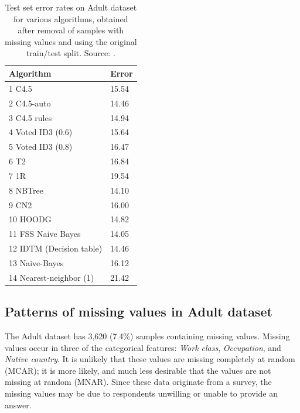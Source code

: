 \documentclass[10pt,twocolumn,letterpaper]{article}
\begin{document}
\begin{table}[htb]
\centering
\begin{tabular}{@{}ll@{}}
\toprule
\textbf{Algorithm}       & \textbf{Error} \\ \midrule
1  C4.5                  & 15.54          \\
2  C4.5-auto             & 14.46          \\
3  C4.5 rules            & 14.94          \\
4  Voted ID3 (0.6)       & 15.64          \\
5  Voted ID3 (0.8)       & 16.47          \\
6  T2                    & 16.84          \\
7  1R                    & 19.54          \\
8  NBTree                & 14.10          \\
9  CN2                   & 16.00          \\
10 HOODG                 & 14.82          \\
11 FSS Naive Bayes       & 14.05          \\
12 IDTM (Decision table) & 14.46          \\
13 Naive-Bayes           & 16.12          \\
14 Nearest-neighbor (1)  & 21.42          \\ \bottomrule
\end{tabular}
\caption{Test set error rates on Adult dataset for various algorithms, obtained after removal of samples with missing values and using the original train/test split. Source: \cite{Lichman2013}.}
\label{tab:benchmarks}
\end{table}

\subsection{Patterns of missing values in Adult dataset}

The Adult dataset has 3,620 (7.4\%) samples containing missing values. Missing values occur in three of the categorical features: \textit{Work class}, \textit{Occupation}, and \textit{Native country}. It is unlikely that these values are missing completely at random (MCAR); it is more likely, and much less desirable that the values are not missing at random (MNAR). Since these data originate from a survey, the missing values may be due to respondents unwilling or unable to provide an answer.  \\
\end{document}
